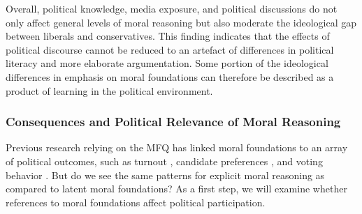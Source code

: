 \documentclass[12pt]{article}
\begin{document}
Overall, political knowledge, media exposure, and political discussions do not only affect general levels of moral reasoning but also moderate the ideological gap between liberals and conservatives. This finding indicates that the effects of political discourse cannot be reduced to an artefact of differences in political literacy and more elaborate argumentation. Some portion of the ideological differences in emphasis on moral foundations can therefore be described as a product of learning in the political environment.
\clearpage


\subsubsection{Consequences and Political Relevance of Moral Reasoning}

Previous research relying on the MFQ has linked moral foundations to an array of political outcomes, such as turnout \citep{johnson2014ideology}, candidate preferences \citep{iyer2010beyond}, and voting behavior \citep{franks2015using}. But do we see the same patterns for explicit moral reasoning as compared to latent moral foundations? As a first step, we will examine whether references to moral foundations affect political participation.
\end{document}
